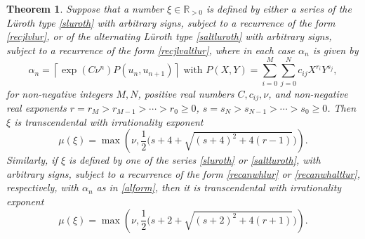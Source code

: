 \documentclass[12pt,a4paper]{amsart}
\newtheorem{theorem}{Theorem}[section]
\theoremstyle{definition}
\numberwithin{equation}{section}
\newcommand\al{{\alpha}}
\newcommand{\R}{\mathbb{R}}
\begin{document}
\begin{theorem}
\label{irratexp} 
Suppose that a number $\xi\in\R_{>0}$ is defined by either a series of the L\"uroth type 
\eqref{sluroth} with arbitrary signs, subject to a recurrence of the form \eqref{recjlvlur}, 
or of the alternating L\"uroth type 
\eqref{saltluroth} with arbitrary signs, subject to a recurrence of the form \eqref{recjlvaltlur}, 
where in each case $\al_n$ is given by 
\begin{equation} 
\label{alform} 
\al_n= \left \lceil{\exp (C\nu^n)}P(u_n,u_{n+1})\right \rceil 
\text{ \ with \ } P(X,Y) = \sum_{i=0}^M \sum_{j=0}^N c_{ij} X^{r_i}Y^{s_j},
\end{equation} 
for non-negative integers $M,N$, positive real numbers $C,c_{ij},\nu$, and non-negative real exponents
$r=r_M>r_{M-1}>\cdots>r_0\geq 0$, $s=s_N>s_{N-1}>\cdots>s_0\geq 0$. Then 
$\xi$ is transcendental with irrationality exponent 
\begin{equation}
\label{muf1}
\mu(\xi) = \max \left(\nu, \frac{1}{2}\Big(s+4+\sqrt{(s+4)^2+4(r-1)}\Big)\right). 
\end{equation} 
Similarly, if $\xi$ is defined by one of the series \eqref{sluroth} or 
\eqref{saltluroth}, with arbitrary signs, subject to a recurrence of the form 
\eqref{recanwhlur} or \eqref{recanwhaltlur}, respectively, with $\al_n$ as in 
\eqref{alform}, then it is transcendental 
with irrationality exponent 
\begin{equation}
\label{muf2}
\mu(\xi) = \max \left(\nu, \frac{1}{2}\Big(s+2+\sqrt{(s+2)^2+4(r+1)}\Big)\right). 
\end{equation} 
\end{theorem} 
\end{document}

